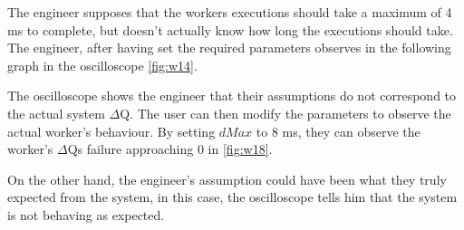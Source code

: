         The engineer supposes that the workers executions should take a maximum of 4 ms to complete, but doesn't actually know how long the executions should take. The engineer, after having set the required parameters observes in the following graph in the oscilloscope \cref{fig:w14}.

    The oscilloscope shows the engineer that their assumptions do not correspond to the actual system $\Delta$Q. The user can then modify the parameters to observe the actual worker's behaviour. By setting $dMax$ to 8 ms, they can observe the worker's $\Delta$Qs failure approaching $0$ in \cref{fig:w18}.

    On the other hand, the engineer's assumption could have been what they truly expected from the system, in this case, the oscilloscope tells him that the system is not behaving as expected. 

